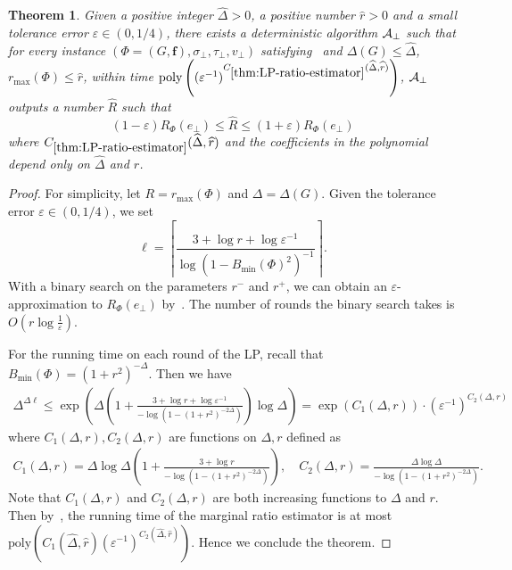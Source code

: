 \documentclass[11pt]{article}
\newtheorem{theorem}{Theorem}
\def\poly{\mathrm{poly}}
\newcommand{\wh}[1]{\widehat{#1}}
\newcommand{\vecf}{\boldsymbol{f}}
\begin{document}
\begin{theorem} \label{thm:LP-ratio-estimator}
    Given a positive integer $\wh{\Delta} > 0$, a positive number $\wh{r} > 0$ and a small tolerance error $\varepsilon \in (0, 1/4)$, there exists a deterministic algorithm $\mathcal{A}_{\bot}$ such that for every instance $(\Phi = (G, \vecf), \sigma_\bot, \tau_\bot, v_\bot)$ satisfying~ and $\Delta(G) \le \wh{\Delta}$, $r_{\max}(\Phi) \le \wh{r}$, within time $\poly\left((\varepsilon^{-1})^{C_{\ref{thm:LP-ratio-estimator}}(\wh{\Delta}, \wh{r})}\right)$, $\mathcal{A}_{\bot}$ outputs a number $\wh{R}$ such that
    $$
        (1 - \varepsilon) R_{\Phi}(e_\bot) \le \wh{R} \le (1 + \varepsilon) R_{\Phi}(e_\bot)
    $$
    where $C_{\ref{thm:LP-ratio-estimator}}(\wh{\Delta}, \wh{r})$ and the coefficients in the polynomial depend only on $\wh{\Delta}$ and $\wh{r}$.
\end{theorem}
\begin{proof}
    For simplicity, let $R = r_{\max}(\Phi)$ and $\Delta = \Delta(G)$. Given the tolerance error $\varepsilon \in (0, 1/4)$, we set
    $$
        \ell = \left\lceil \frac{3 + \log{r} + \log{\varepsilon^{-1}}}{\log\left(1 - B_{\min}(\Phi)^2\right)^{-1}} \right\rceil.
    $$
    With a binary search on the parameters $r^-$ and $r^+$, we can obtain an $\varepsilon$-approximation to $R_\Phi(e_\bot)$ by~. The number of rounds the binary search takes is $O\left(r\log{\frac{1}{\varepsilon}}\right)$.

    For the running time on each round of the LP, recall that $B_{\min}(\Phi) = (1 + r^2)^{-\Delta}$. Then we have
    \begin{align*}
        \Delta^{\Delta \ell} \le \exp\left(\Delta\left(1 + \frac{3 + \log{r} + \log{\varepsilon^{-1}}}{-\log\left(1 - (1 + r^2)^{-2\Delta}\right)}\right) \log{\Delta}\right) = \exp(C_1(\Delta, r)) \cdot \left(\varepsilon^{-1}\right)^{C_2(\Delta, r)}
    \end{align*}
    where $C_1(\Delta, r), C_2(\Delta, r)$ are functions on $\Delta, r$ defined as
    \begin{align*}
        C_1(\Delta, r) = \Delta \log{\Delta} \left(1 + \frac{3 + \log{r}}{-\log\left(1 - (1 + r^2)^{-2\Delta}\right)}\right), \quad C_2(\Delta, r) = \frac{\Delta \log \Delta}{-\log\left(1 - (1 + r^2)^{-2\Delta}\right)}.
    \end{align*}
    Note that $C_1(\Delta, r)$ and $C_2(\Delta, r)$ are both increasing functions to $\Delta$ and $r$. Then by~, the running time of the marginal ratio estimator is at most $\poly\left(C_1(\wh{\Delta}, \wh{r}) (\varepsilon^{-1})^{C_2(\wh{\Delta}, \wh{r})}\right)$. Hence we conclude the theorem.
\end{proof}
\end{document}
